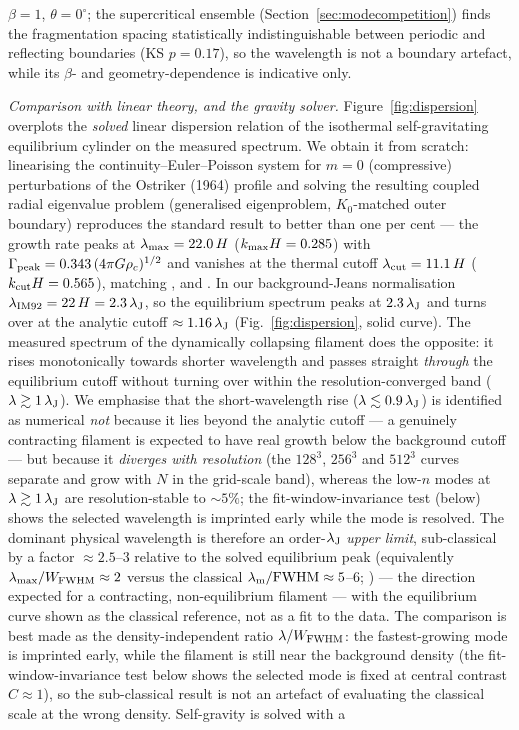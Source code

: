 \documentclass[usenatbib,twoside,twocolumn]{mnras}
\begin{document}
$\beta=1$, $\theta=0^\circ$; the supercritical ensemble (Section~\ref{sec:modecompetition}) finds the fragmentation spacing statistically indistinguishable between periodic and reflecting boundaries (KS $p=0.17$), so the wavelength is not a boundary artefact, while its $\beta$- and geometry-dependence is indicative only.

\emph{Comparison with linear theory, and the gravity solver.} Figure~\ref{fig:dispersion} overplots the \emph{solved} linear dispersion relation of the isothermal self-gravitating equilibrium cylinder on the measured spectrum. We obtain it from scratch: linearising the continuity--Euler--Poisson system for $m=0$ (compressive) perturbations of the Ostriker (1964) profile and solving the resulting coupled radial eigenvalue problem (generalised eigenproblem, $K_0$-matched outer boundary) reproduces the standard result to better than one per cent --- the growth rate peaks at $\lambda_{\rm max}=22.0\,H$ ($k_{\rm max}H=0.285$) with $\Gamma_{\rm peak}=0.343\,(4\pi G\rho_c)^{1/2}$ and vanishes at the thermal cutoff $\lambda_{\rm cut}=11.1\,H$ ($k_{\rm cut}H=0.565$), matching \citet{Nagasawa1987}, \citet{Inutsuka1992} and \citet{Fischera2012}. In our background-Jeans normalisation $\lambda_{\rm IM92}=22\,H=2.3\,\lambda_{\rm J}$, so the equilibrium spectrum peaks at $2.3\,\lambda_{\rm J}$ and turns over at the analytic cutoff $\approx1.16\,\lambda_{\rm J}$ (Fig.~\ref{fig:dispersion}, solid curve). The measured spectrum of the dynamically collapsing filament does the opposite: it rises monotonically towards shorter wavelength and passes straight \emph{through} the equilibrium cutoff without turning over within the resolution-converged band ($\lambda\gtrsim1\,\lambda_{\rm J}$). We emphasise that the short-wavelength rise ($\lambda\lesssim0.9\,\lambda_{\rm J}$) is identified as numerical \emph{not} because it lies beyond the analytic cutoff --- a genuinely contracting filament is expected to have real growth below the background cutoff --- but because it \emph{diverges with resolution} (the $128^3$, $256^3$ and $512^3$ curves separate and grow with $N$ in the grid-scale band), whereas the low-$n$ modes at $\lambda\gtrsim1\,\lambda_{\rm J}$ are resolution-stable to $\sim5\%$; the fit-window-invariance test (below) shows the selected wavelength is imprinted early while the mode is resolved. The dominant physical wavelength is therefore an order-$\lambda_{\rm J}$ \emph{upper limit}, sub-classical by a factor $\approx2.5$--$3$ relative to the solved equilibrium peak (equivalently $\lambda_{\rm max}/W_{\rm FWHM}\approx2$ versus the classical $\lambda_{\rm m}/{\rm FWHM}\approx5$--$6$; \citealt{Fischera2012}) --- the direction expected for a contracting, non-equilibrium filament \citep{Clarke2016,Clarke2017} --- with the equilibrium curve shown as the classical reference, not as a fit to the data. The comparison is best made as the density-independent ratio $\lambda/W_{\rm FWHM}$: the fastest-growing mode is imprinted early, while the filament is still near the background density (the fit-window-invariance test below shows the selected mode is fixed at central contrast $C\approx1$), so the sub-classical result is not an artefact of evaluating the classical scale at the wrong density. Self-gravity is solved with a 
\end{document}
